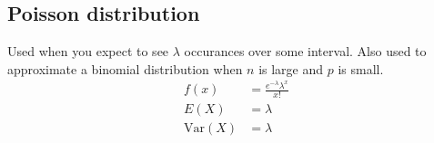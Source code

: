 \documentclass{article}
\newcommand{\var}{\text{Var}}
\begin{document}
\begin{multicols*}{2}
\subsection{Poisson distribution}
Used when you expect to see $\lambda$ occurances over some interval. Also used to approximate a binomial distribution when $n$ is large and $p$ is small.
\begin{align*}
    f(x) &= \frac{e^{-\lambda} \lambda^x}{x!} \\
    E(X) &= \lambda \\
    \var(X) &= \lambda
\end{align*}

\end{multicols*}
\end{document}

